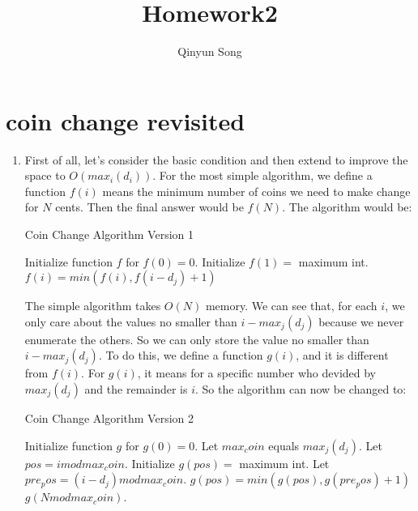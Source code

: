 \documentclass{article}
\title{Homework2}
\author{Qinyun Song}
\date{}
\begin{document}
	\maketitle

	\section{coin change revisited}
		\begin{enumerate}
			\item First of all, let's consider the basic condition and then extend to improve the space to $O(max_i(d_i))$. For the most simple algorithm, we define a function $f(i)$ means the minimum number of coins we need to make change for $N$ cents. Then the final answer would be $f(N)$. The algorithm would be:
			\begin{algorithm}[H]
				\caption{Coin Change Algorithm Version 1}
				\begin{algorithmic}[1]
				\State Initialize function $f$ for $f(0) = 0$. 
				\State {}
					\State Initialize $f(1) =$ maximum int.
							\State $f(i) = min(f(i), f(i - d_j) + 1)$
						\EndIf
					\EndFor
				\EndFor
				\State {}
				\end{algorithmic}
			\end{algorithm}
			The simple algorithm takes $O(N)$ memory. We can see that, for each $i$, we only care about the values no smaller than $i - max_j(d_j)$ because we never enumerate the others. So we can only store the value no smaller than $i - max_j(d_j)$. To do this, we define a function $g(i)$, and it is different from $f(i)$. For $g(i)$, it means for a specific number who devided by $max_j(d_j)$ and the remainder is $i$. So the algorithm can now be changed to:
			\begin{algorithm}[H]
				\caption{Coin Change Algorithm Version 2}
				\begin{algorithmic}[1]
				\State Initialize function $g$ for $g(0) = 0$.
				\State Let $max_coin$ equals $max_j(d_j)$.
				\State {}
					\State Let $pos = i mod max_coin$.
					\State Initialize $g(pos) =$ maximum int.
							\State Let $pre_pos = (i - d_j) mod max_coin$.
							\State $g(pos) = min(g(pos), g(pre_pos) + 1)$
						\EndIf
					\EndFor
				\EndFor
				\State \Return $g(N mod max_coin)$.
				\end{algorithmic}
			\end{algorithm}

\end{enumerate}
\end{document}
